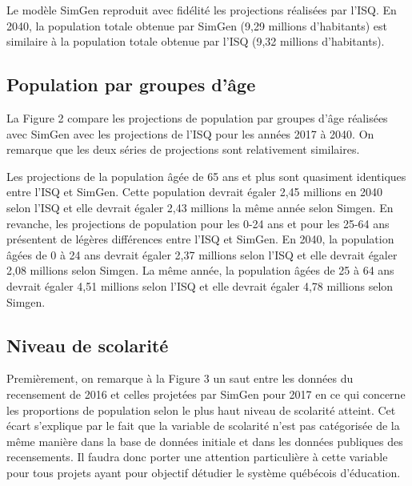 \documentclass[letterpaper,10pt,french]{sphinxmanual}
\begin{document}
Le modèle SimGen reproduit avec fidélité les projections réalisées par l’ISQ. En 2040, la population totale obtenue par SimGen (9,29 millions d’habitants) est similaire à la population totale obtenue par l’ISQ (9,32 millions d’habitants).


\subsection{Population par groupes d’âge}
\label{\detokenize{resultats:population-par-groupes-d-age}}
\begin{figure}[htbp]
\centering

\noindent{}
\end{figure}

La Figure 2 compare les projections de population par groupes d’âge réalisées avec SimGen avec les projections de l’ISQ pour les années 2017 à 2040.
On remarque que les deux séries de projections sont relativement similaires.

Les projections de la population âgée de 65 ans et plus sont quasiment identiques entre l’ISQ et SimGen.
Cette population devrait égaler 2,45 millions en 2040 selon l’ISQ et elle devrait égaler 2,43 millions la même année selon Simgen.
En revanche, les projections de population pour les 0-24 ans  et pour les 25-64 ans présentent de légères différences entre l’ISQ et SimGen.
En 2040, la population âgées de 0 à 24 ans devrait égaler 2,37 millions selon l’ISQ et elle devrait égaler 2,08 millions selon Simgen.
La même année, la population âgées de 25 à 64 ans devrait égaler 4,51 millions selon l’ISQ et elle devrait égaler 4,78 millions selon Simgen.


\subsection{Niveau de scolarité}
\label{\detokenize{resultats:niveau-de-scolarite}}
\begin{figure}[htbp]
\centering

\noindent{}
\end{figure}

Premièrement, on remarque à la Figure 3 un saut entre les données du recensement de 2016 et celles projetées par SimGen pour 2017 en ce qui concerne les proportions de population selon le plus haut niveau de scolarité atteint. Cet écart s’explique par le fait que la variable de scolarité n’est pas catégorisée de la même manière dans la base de données initiale et dans les données publiques des recensements. Il faudra donc porter une attention particulière à cette variable pour tous projets ayant pour objectif détudier le système québécois d’éducation.
\end{document}
